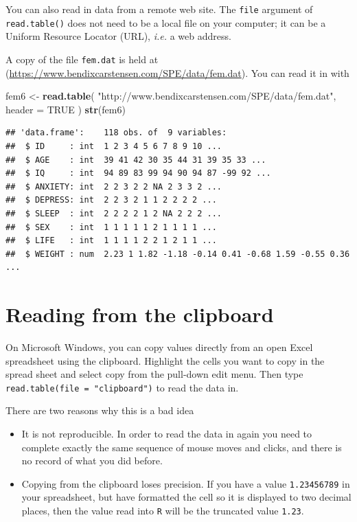 \documentclass[
]{book}
\newenvironment{Shaded}{\begin{snugshade}}{\end{snugshade}}
\newcommand{\AttributeTok}[1]{\textcolor[rgb]{0.13,0.29,0.53}{#1}}
\newcommand{\ConstantTok}[1]{\textcolor[rgb]{0.56,0.35,0.01}{#1}}
\newcommand{\FunctionTok}[1]{\textcolor[rgb]{0.13,0.29,0.53}{\textbf{#1}}}
\newcommand{\NormalTok}[1]{#1}
\newcommand{\OtherTok}[1]{\textcolor[rgb]{0.56,0.35,0.01}{#1}}
\newcommand{\StringTok}[1]{\textcolor[rgb]{0.31,0.60,0.02}{#1}}
\providecommand{\tightlist}{%
  \setlength{\itemsep}{0pt}\setlength{\parskip}{0pt}}
\theoremstyle{definition}
\theoremstyle{definition}
\theoremstyle{definition}
\theoremstyle{definition}
\theoremstyle{remark}
\begin{document}
You can also read in data from a remote web site. The \texttt{file}
argument of \texttt{read.table()} does not need to be a local file on
your computer; it can be a Uniform Resource Locator (URL), \emph{i.e.}
a web address.

A copy of the file \texttt{fem.dat} is held at
(\url{https://www.bendixcarstensen.com/SPE/data/fem.dat}). You can
read it in with

\begin{Shaded}
\begin{Highlighting}[]
\NormalTok{fem6 }\OtherTok{\textless{}{-}} 
  \FunctionTok{read.table}\NormalTok{(}
    \StringTok{"http://www.bendixcarstensen.com/SPE/data/fem.dat"}\NormalTok{,}
    \AttributeTok{header =} \ConstantTok{TRUE}
\NormalTok{  )}
\FunctionTok{str}\NormalTok{(fem6)}
\end{Highlighting}
\end{Shaded}

\begin{verbatim}
## 'data.frame':    118 obs. of  9 variables:
##  $ ID     : int  1 2 3 4 5 6 7 8 9 10 ...
##  $ AGE    : int  39 41 42 30 35 44 31 39 35 33 ...
##  $ IQ     : int  94 89 83 99 94 90 94 87 -99 92 ...
##  $ ANXIETY: int  2 2 3 2 2 NA 2 3 3 2 ...
##  $ DEPRESS: int  2 2 3 2 1 1 2 2 2 2 ...
##  $ SLEEP  : int  2 2 2 2 1 2 NA 2 2 2 ...
##  $ SEX    : int  1 1 1 1 1 2 1 1 1 1 ...
##  $ LIFE   : int  1 1 1 1 2 2 1 2 1 1 ...
##  $ WEIGHT : num  2.23 1 1.82 -1.18 -0.14 0.41 -0.68 1.59 -0.55 0.36 ...
\end{verbatim}

\section{Reading from the clipboard}\label{reading-from-the-clipboard}

On Microsoft Windows, you can copy values directly from an open Excel
spreadsheet using the clipboard. Highlight the cells you want to copy
in the spread sheet and select copy from the pull-down edit menu. Then
type \texttt{read.table(file\ =\ "clipboard")} to read the data in.

There are two reasons why this is a bad idea

\begin{itemize}
\tightlist
\item
  It is not reproducible. In order to read the data in again you
  need to complete exactly the same sequence of mouse moves and clicks,
  and there is no record of what you did before.
\item
  Copying from the clipboard loses precision. If you have a value
  \texttt{1.23456789} in your spreadsheet, but have formatted the cell so it
  is displayed to two decimal places, then the value read into
  \texttt{R} will be the truncated value \texttt{1.23}.
\end{itemize}
\end{document}
